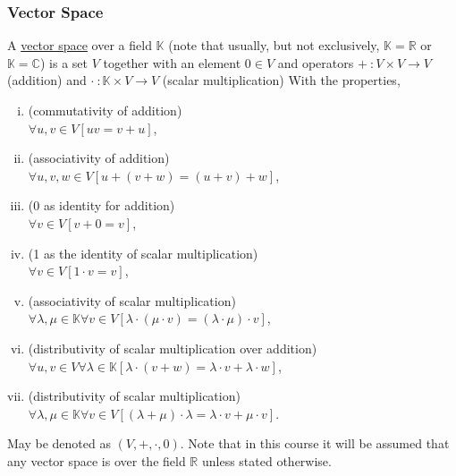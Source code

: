 \subsubsection*{Vector Space}
\udef A \ul{vector space} over a field $\mathbb{K}$
(note that usually, but not exclusively, $\mathbb{K} = \mathbb{R}$ or $\mathbb{K} = \mathbb{C}$)
is a set $V$ together with an element $0 \in V$ and operators $+\ \colon V \times V \to V$
(addition) and $\cdot\ \colon \mathbb{K} \times V \to V$ (scalar multiplication)
With the properties,
\begin{enumerate}[(i)]
    \item (commutativity of addition)\\
        $\forall u,v \in V \left[ u v = v + u \right]$,
    \item (associativity of addition)\\
        $\forall u,v,w \in V \left[ u+(v+w) = (u+v)+w \right]$,
    \item (0 as identity for addition)\\
        $\forall v \in V \left[ v + 0 = v \right]$,
    \item (1 as the identity of scalar multiplication)\\
        $\forall v \in V \left[ 1 \cdot v = v \right]$,
    \item (associativity of scalar multiplication)\\
        $\forall \lambda,\mu \in \mathbb{K} \forall v \in V \left[
            \lambda \cdot (\mu \cdot v) = (\lambda \cdot \mu) \cdot v \right]$,
    \item (distributivity of scalar multiplication over addition)\\
        $\forall u,v \in V \forall \lambda \in \mathbb{K} \left[
        \lambda \cdot (v + w) = \lambda \cdot v + \lambda \cdot w \right]$,
    \item (distributivity of scalar multiplication)\\
        $\forall \lambda, \mu \in \mathbb{K} \forall v \in V \left[
            (\lambda + \mu) \cdot \lambda = \lambda \cdot v + \mu \cdot v \right]$.
\end{enumerate}
May be denoted as $(V, +, \cdot, 0)$.
Note that in this course it will be assumed that any vector space is over the field
$\mathbb{R}$ unless stated otherwise.


